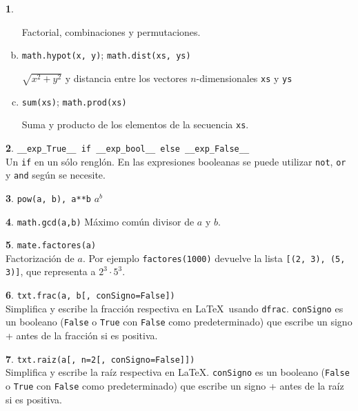 \documentclass[12pt]{article}
\theoremstyle{definition}
\newtheorem{funcion}{}[section]
\begin{document}
\begin{funcion}
\begin{enumerate}[a)]
      Factorial, combinaciones y permutaciones.

    \item \verb|math.hypot(x, y)|; \verb|math.dist(xs, ys)|

      $\sqrt{x^2+y^2}$ y distancia entre los vectores $n$-dimensionales  \verb|xs| y \verb|ys|

    \item \verb|sum(xs)|; \verb|math.prod(xs)|

      Suma y producto de los elementos de la secuencia \verb|xs|.

  \end{enumerate}
\end{funcion}

\begin{funcion} \verb|__exp_True__ if __exp_bool__ else __exp_False__| \\[1ex]
  Un \verb|if| en un sólo renglón. En las expresiones booleanas se puede utilizar \verb|not|, \verb|or| y \verb|and| según se necesite.
\end{funcion}

\begin{funcion}
  \verb|pow(a, b), a**b| \quad
  $a^b$
\end{funcion}

\begin{funcion}
  \verb|math.gcd(a,b)| \quad
  Máximo común divisor de $a$ y $b$.
\end{funcion}

\begin{funcion}
  \verb|mate.factores(a)| \\[1ex]
  Factorización de $a$. Por ejemplo \verb|factores(1000)| devuelve la lista \verb|[(2, 3), (5, 3)]|, que representa a $2^3\cdot 5^3$.
\end{funcion}

\begin{funcion}
  \verb|txt.frac(a, b[, conSigno=False])| \\[1ex]
  Simplifica y escribe la fracción respectiva en \LaTeX\ usando \verb|dfrac|. \verb|conSigno| es un booleano (\verb|False| o \verb|True| con \verb|False| como predeterminado) que escribe un signo + antes de la fracción si es positiva.
\end{funcion}

\begin{funcion}
  \verb|txt.raiz(a[, n=2[, conSigno=False]])| \\[1ex]
  Simplifica y escribe la raíz respectiva en \LaTeX. \verb|conSigno| es un booleano (\verb|False| o \verb|True| con \verb|False| como predeterminado) que escribe un signo + antes de la raíz si es positiva.
\end{funcion}
\end{document}

